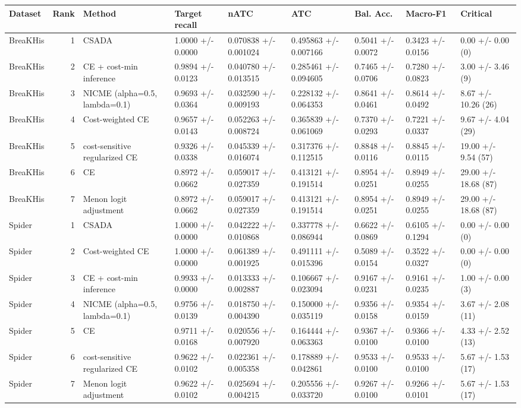 \begin{tabular}{lrlllllll}
\toprule
Dataset & Rank & Method & Target recall & nATC & ATC & Bal. Acc. & Macro-F1 & Critical \\
\midrule
BreaKHis & 1 & CSADA & 1.0000 +/- 0.0000 & 0.070838 +/- 0.001024 & 0.495863 +/- 0.007166 & 0.5041 +/- 0.0072 & 0.3423 +/- 0.0156 & 0.00 +/- 0.00 (0) \\
BreaKHis & 2 & CE + cost-min inference & 0.9894 +/- 0.0123 & 0.040780 +/- 0.013515 & 0.285461 +/- 0.094605 & 0.7465 +/- 0.0706 & 0.7280 +/- 0.0823 & 3.00 +/- 3.46 (9) \\
BreaKHis & 3 & NICME (alpha=0.5, lambda=0.1) & 0.9693 +/- 0.0364 & 0.032590 +/- 0.009193 & 0.228132 +/- 0.064353 & 0.8641 +/- 0.0461 & 0.8614 +/- 0.0492 & 8.67 +/- 10.26 (26) \\
BreaKHis & 4 & Cost-weighted CE & 0.9657 +/- 0.0143 & 0.052263 +/- 0.008724 & 0.365839 +/- 0.061069 & 0.7370 +/- 0.0293 & 0.7221 +/- 0.0337 & 9.67 +/- 4.04 (29) \\
BreaKHis & 5 & cost-sensitive regularized CE & 0.9326 +/- 0.0338 & 0.045339 +/- 0.016074 & 0.317376 +/- 0.112515 & 0.8848 +/- 0.0116 & 0.8845 +/- 0.0115 & 19.00 +/- 9.54 (57) \\
BreaKHis & 6 & CE & 0.8972 +/- 0.0662 & 0.059017 +/- 0.027359 & 0.413121 +/- 0.191514 & 0.8954 +/- 0.0251 & 0.8949 +/- 0.0255 & 29.00 +/- 18.68 (87) \\
BreaKHis & 7 & Menon logit adjustment & 0.8972 +/- 0.0662 & 0.059017 +/- 0.027359 & 0.413121 +/- 0.191514 & 0.8954 +/- 0.0251 & 0.8949 +/- 0.0255 & 29.00 +/- 18.68 (87) \\
Spider & 1 & CSADA & 1.0000 +/- 0.0000 & 0.042222 +/- 0.010868 & 0.337778 +/- 0.086944 & 0.6622 +/- 0.0869 & 0.6105 +/- 0.1294 & 0.00 +/- 0.00 (0) \\
Spider & 2 & Cost-weighted CE & 1.0000 +/- 0.0000 & 0.061389 +/- 0.001925 & 0.491111 +/- 0.015396 & 0.5089 +/- 0.0154 & 0.3522 +/- 0.0327 & 0.00 +/- 0.00 (0) \\
Spider & 3 & CE + cost-min inference & 0.9933 +/- 0.0000 & 0.013333 +/- 0.002887 & 0.106667 +/- 0.023094 & 0.9167 +/- 0.0231 & 0.9161 +/- 0.0235 & 1.00 +/- 0.00 (3) \\
Spider & 4 & NICME (alpha=0.5, lambda=0.1) & 0.9756 +/- 0.0139 & 0.018750 +/- 0.004390 & 0.150000 +/- 0.035119 & 0.9356 +/- 0.0158 & 0.9354 +/- 0.0159 & 3.67 +/- 2.08 (11) \\
Spider & 5 & CE & 0.9711 +/- 0.0168 & 0.020556 +/- 0.007920 & 0.164444 +/- 0.063363 & 0.9367 +/- 0.0100 & 0.9366 +/- 0.0100 & 4.33 +/- 2.52 (13) \\
Spider & 6 & cost-sensitive regularized CE & 0.9622 +/- 0.0102 & 0.022361 +/- 0.005358 & 0.178889 +/- 0.042861 & 0.9533 +/- 0.0100 & 0.9533 +/- 0.0100 & 5.67 +/- 1.53 (17) \\
Spider & 7 & Menon logit adjustment & 0.9622 +/- 0.0102 & 0.025694 +/- 0.004215 & 0.205556 +/- 0.033720 & 0.9267 +/- 0.0100 & 0.9266 +/- 0.0101 & 5.67 +/- 1.53 (17) \\
\bottomrule
\end{tabular}
